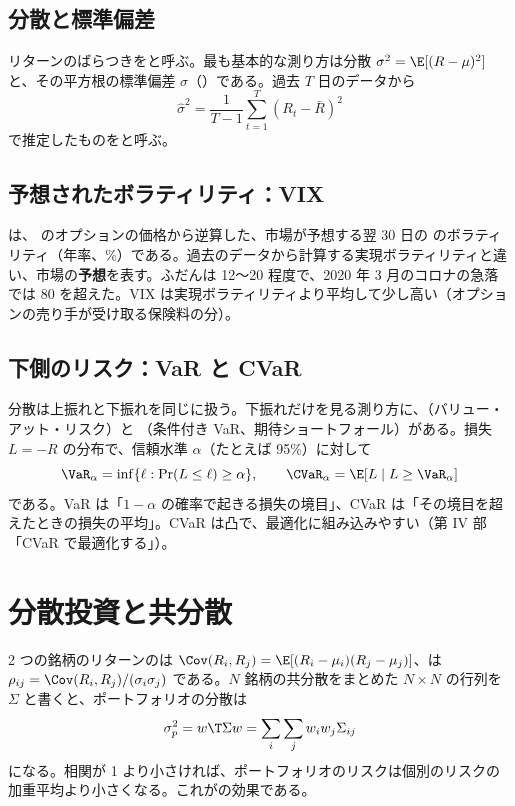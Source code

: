 \subsection{分散と標準偏差}

リターンのばらつきをと呼ぶ。最も基本的な測り方は分散 $\sigma^2 = \E[(R-\mu)^2]$ と、その平方根の標準偏差 $\sigma$（）である。過去 $T$ 日のデータから
\[ \hat\sigma^2 = \frac{1}{T-1}\sum_{t=1}^{T}(R_t - \bar R)^2 \]
で推定したものをと呼ぶ。

\subsection{予想されたボラティリティ：VIX}

 は、\SP{} のオプションの価格から逆算した、市場が予想する翌 30 日の \SP{} のボラティリティ（年率、\%）である。過去のデータから計算する実現ボラティリティと違い、市場の\textbf{予想}を表す。ふだんは 12〜20 程度で、2020 年 3 月のコロナの急落では 80 を超えた。VIX は実現ボラティリティより平均して少し高い（オプションの売り手が受け取る保険料の分）。

\subsection{下側のリスク：VaR と CVaR}

分散は上振れと下振れを同じに扱う。下振れだけを見る測り方に、（バリュー・アット・リスク）と （条件付き VaR、期待ショートフォール）がある。損失 $L=-R$ の分布で、信頼水準 $\alpha$（たとえば 95\%）に対して
\[ \VaR_\alpha = \inf\{\ell : \Pr(L \le \ell) \ge \alpha\}, \qquad \CVaR_\alpha = \E[L \mid L \ge \VaR_\alpha] \]
である。VaR は「$1-\alpha$ の確率で起きる損失の境目」、CVaR は「その境目を超えたときの損失の平均」。CVaR は凸で、最適化に組み込みやすい（第 IV 部「CVaR で最適化する」）。

\section{分散投資と共分散}

2 つの銘柄のリターンのは $\Cov(R_i,R_j) = \E[(R_i-\mu_i)(R_j-\mu_j)]$、は $\rho_{ij} = \Cov(R_i,R_j)/(\sigma_i\sigma_j)$ である。$N$ 銘柄の共分散をまとめた $N\times N$ の行列を $\Sigma$ と書くと、ポートフォリオの分散は
\begin{equation}
\sigma_p^2 = w\T \Sigma w = \sum_i\sum_j w_i w_j \Sigma_{ij}
\label{eq:port-var}
\end{equation}
になる。相関が 1 より小さければ、ポートフォリオのリスクは個別のリスクの加重平均より小さくなる。これがの効果である。

